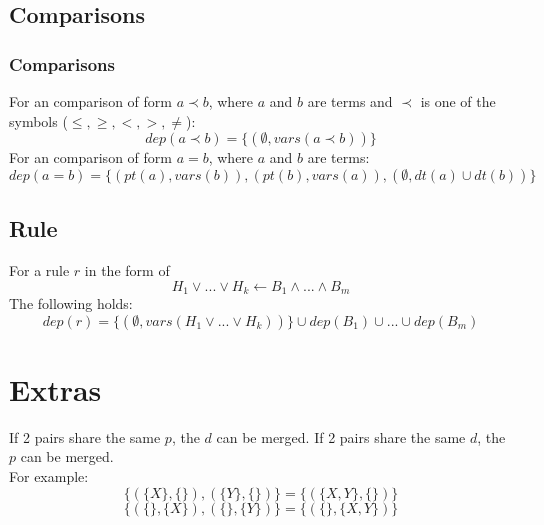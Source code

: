 \documentclass{article}
\newcommand{\set}[1]{\{#1\}}
\newcommand{\provide}[2]{\{(\{#1\}, \{#2\})\}}
\newcommand{\provideM}[4]{\{(\{#1\}, \{#2\}), (\{#3\},\{#4\})\}}
\begin{document}
	\subsection{Comparisons}
	\subsubsection{Comparisons}
	For an comparison of form $a \prec b$, where $a$ and $b$ are terms and $\prec$ is one of the symbols ($\leq,\ge,<,>,\neq$):
	\begin{equation}
		dep(a \prec b) = \set{(\emptyset, vars(a \prec b))}
	\end{equation}
	For an comparison of form $a = b$, where $a$ and $b$ are terms:
	\begin{equation}
		dep(a = b) = \set{(pt(a), vars(b)), (pt(b), vars(a)), (\emptyset, dt(a) \cup dt(b))}
	\end{equation}

	\subsection{Rule}
	For a rule $r$ in the form of
	\begin{equation}
		H_1 \lor ... \lor H_k  \leftarrow B_1 \land ... \land B_m 
	\end{equation}
	The following holds:
	\begin{dmath}
		dep(r) = \set{(\emptyset, vars(H_1\vee ... \vee H_k))} \cup dep(B_1) \cup ... \cup dep(B_m)
	\end{dmath}

	\section{Extras}
	If 2 pairs share the same $p$, the $d$ can be merged. If 2 pairs share the same $d$, the $p$ can be merged.
	\\ For example:
	\begin{equation}
		\provideM{X}{}{Y}{} = \provide{X,Y}{}
	\end{equation}
	\begin{equation}
		\provideM{}{X}{}{Y} = \provide{}{X,Y}
	\end{equation}
\end{document}
